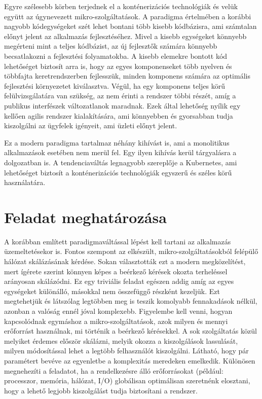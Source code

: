 Egyre szélesebb körben terjednek el a konténerizációs technológiák és velük együtt az úgynevezett mikro-szolgáltatások\citep{monoliticAndMicroserviceArchitecture}.
A paradigma értelmében a korábbi nagyobb kódegységeket szét lehet bontani több kisebb kódbázisra, ami számtalan előnyt jelent az alkalmazás fejlesztéséhez.
Mivel a kisebb egységeket könnyebb megérteni mint a teljes kódbázist, az új fejlesztők számára könnyebb becsatlakozni a fejlesztési folyamatokba.
A kisebb elemekre bontott kód lehetőséget biztosít arra is, hogy az egyes komponenseket több nyelven és többfajta keretrendszerben fejlesszük, minden komponens számára az optimális fejlesztési környezetet kiválasztva. 
Végül, ha egy komponens teljes körű felülvizsgálatára van szükség, az nem érinti a rendszer többi részét, amíg a publikus interfészek változatlanok maradnak. 
Ezek által lehetőség nyílik egy kellően agilis rendszer kialakítására, ami könnyebben és gyorsabban tudja kiszolgálni az ügyfelek igényeit, ami üzleti előnyt jelent.

Ez a modern paradigma tartalmaz néhány kihívást is, ami a monolitikus alkalmazások esetében nem merül fel.
Egy ilyen kihívás kerül tárgyalásra a dolgozatban is.
A tendenciaváltás legnagyobb szereplője a Kubernetes\citep{kubernetesBaseDocumentation}, ami lehetőséget biztosít a konténerizációs technológiák egyszerű és széles körű használatára.

\section{Feladat meghatározása}
A korábban említett paradigmaváltással lépést kell tartani az alkalmazás üzemeltetésekor is. 
Fontos szempont az elkészült, mikro-szolgáltatásokból felépülő hálózat skálázásának kérdése. 
Sokan választották ezt a modern megközelítést, mert ígérete szerint könnyen képes a beérkező kérések okozta terheléssel arányosan skálázódni.
Ez egy triviális feladat egészen addig amíg az egyes egységeket különálló, másokkal nem összefüggő részként kezeljük.
Ezt megtehetjük és látszólag legtöbben meg is teszik komolyabb fennakadások nélkül, azonban a valóság ennél jóval komplexebb.
Figyelembe kell venni, hogyan kapcsolódnak egymáshoz a mikro-szolgáltatások, azok milyen és mennyi erőforrást használnak, mi történik a beérkező kérésekkel.
A sok szolgáltatás közül melyiket érdemes először skálázni, melyik okozza a kiszolgálások lassulását, milyen módosítással lehet a legtöbb felhasználót kiszolgálni.
Látható, hogy pár paramétert bevéve az egyenletbe a komplexitás meredeken emelkedik. 
Különösen megnehezíti a feladatot, ha a rendelkezésre álló erőforrásokat (például: processzor, memória, hálózat, I/O) globálisan optimálisan szeretnénk elosztani, hogy a lehető legjobb kiszolgálást tudja biztosítani a rendszer. 

